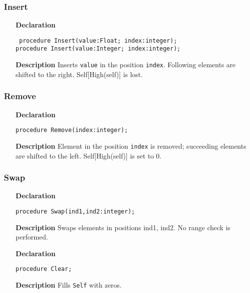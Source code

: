 \documentclass[12pt,a4paper,oneside]{report}
\newcommand{\declarationitem}[1]{\textbf{#1}}
\newcommand{\descriptiontitle}[1]{\textbf{#1}}
\newcommand{\code}[1]{\texttt{#1}}
\begin{document}
\subsubsection{Insert}
\begin{itemize}
	\item[\declarationitem{Declaration}\hfill]
	\begin{flushleft}
\code{     procedure Insert(value:Float; index:integer);\\ \vspace{4pt}
     procedure Insert(value:Integer; index:integer);
}	\end{flushleft}
	\item[\descriptiontitle{Description}]
	Inserts \code{value} in the position \code{index}. Following elements are shifted to the right. Self[High(self)] is lost.
\end{itemize}
\subsubsection{Remove}
\begin{itemize}
	\item[\declarationitem{Declaration}\hfill]
	\begin{flushleft}
     \code{procedure Remove(index:integer);}
	\end{flushleft}
	\item[\descriptiontitle{Description}\hfill]
	Element in the position \code{index} is removed; succeeding elements are shifted to the left. Self[High(self)] is set to 0. 
\end{itemize}
\subsubsection{Swap}
\begin{itemize}
	\item[\declarationitem{Declaration}\hfill]
	\begin{flushleft}
     \code{procedure Swap(ind1,ind2:integer);}
	\end{flushleft}
	\item[\descriptiontitle{Description}\hfill]
	Swaps elements in positions ind1, ind2. No range check is performed.
\end{itemize}
\begin{itemize}
	\item[\declarationitem{Declaration}\hfill]
	\begin{flushleft}
	\code{procedure Clear;}	
	\end{flushleft}
	\item[\descriptiontitle{Description}]
	Fills \code{Self} with zeros.
\end{itemize}	
\end{document}
